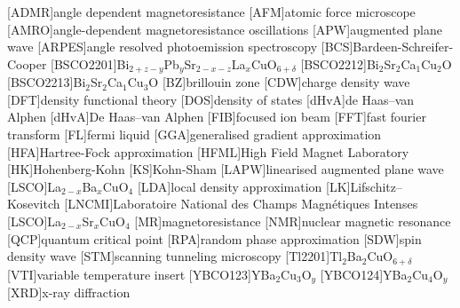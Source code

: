 
\cleardoublepage



[ADMR]{angle dependent magnetoresistance}
[AFM]{atomic force microscope}
[AMRO]{angle-dependent magnetoresistance oscillations}
[APW]{augmented plane wave}
[ARPES]{angle resolved photoemission spectroscopy}
[BCS]{Bardeen-Schreifer-Cooper}
[BSCO2201]{Bi$_{2+z-y}$Pb$_{y}$Sr$_{2-x-z}$La$_{x}$CuO$_{6+\delta}$}
[BSCO2212]{Bi$_2$Sr$_2$Ca$_1$Cu$_2$O}
[BSCO2213]{Bi$_2$Sr$_2$Ca$_1$Cu$_3$O}
[BZ]{brillouin zone}
[CDW]{charge density wave}
[DFT]{density functional theory}
[DOS]{density of states}
[dHvA]{de Haas--van Alphen}
[dHvA]{De Haas--van Alphen}
[FIB]{focused ion beam}
[FFT]{fast fourier transform}
[FL]{fermi liquid}
[GGA]{generalised gradient approximation}
[HFA]{Hartree-Fock approximation}
[HFML]{High Field Magnet Laboratory}
[HK]{Hohenberg-Kohn}
[KS]{Kohn-Sham}
[LAPW]{linearised augmented plane wave}
[LSCO]{La$_{2-x}$Ba$_x$CuO$_4$}
[LDA]{local density approximation}
[LK]{Lifschitz--Kosevitch}
[LNCMI]{Laboratoire National des Champs Magn\'{e}tiques Intenses} 
[LSCO]{La$_{2-x}$Sr$_x$CuO$_4$}
[MR]{magnetoresistance}
[NMR]{nuclear magnetic resonance}
[QCP]{quantum critical point}
[RPA]{random phase approximation}
[SDW]{spin density wave}
[STM]{scanning tunneling microscopy}
[Tl2201]{Tl$_2$Ba$_2$CuO$_{6+\delta}$}
[VTI]{variable temperature insert}
[YBCO123]{YBa$_2$Cu$_3$O$_y$}
[YBCO124]{YBa$_2$Cu$_4$O$_y$}
[XRD]{x-ray diffraction}

